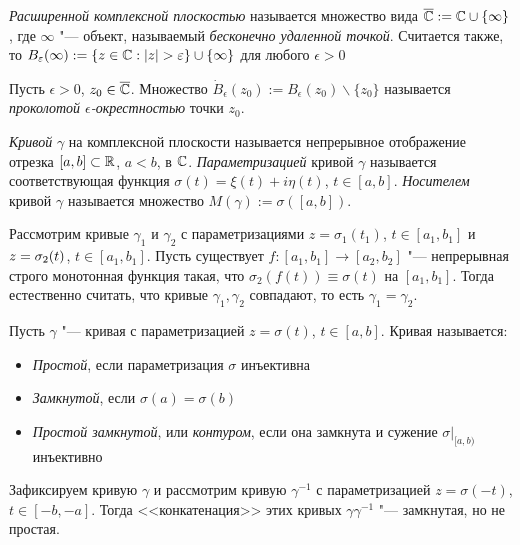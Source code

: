 \begin{definition}
	\textit{Расширенной комплексной плоскостью} называется множество вида $\overline{\mathbb{C}} := \mathbb{C} \cup \{\infty\}$, где $\infty$ "--- объект, называемый \textit{бесконечно удаленной точкой}. Считается также, то $B_{\varepsilon}(\infty) := \{z \in \mathbb{C}: |z| > \varepsilon\} \cup \{\infty\}$ для любого $\epsilon > 0$
\end{definition}

\begin{definition}
	Пусть $\epsilon > 0$, $z_0 \in \overline{\mathbb{C}}$. Множество $\dot B_\epsilon(z_0) := B_\epsilon(z_0) \backslash \{z_0\}$ называется \textit{проколотой $\epsilon$-окрестностью} точки $z_0$.
\end{definition}

\begin{definition}
	\textit{Кривой} $\gamma$ на комплексной плоскости называется непрерывное отображение отрезка $[a, b] \subset \mathbb{R}$, $a < b$, в $\mathbb{C}$. \textit{Параметризацией} кривой $\gamma$ называется соответствующая 	функция $\sigma(t) = \xi(t) + i\eta(t)$, $t \in [a, b]$. \textit{Носителем} кривой $\gamma$ называется множество $M(\gamma) := \sigma([a, b])$. 
\end{definition}

\begin{note}
	Рассмотрим кривые $\gamma_1$ и $\gamma_2$ с параметризациями $z = \sigma_1(t_1)$, $t \in [a_1, b_1]$ и $z \hm= \sigma_2(t)$, $t \in [a_1, b_1]$. Пусть существует $f : [a_1, b_1] \to [a_2, b_2]$ "--- непрерывная строго монотонная функция такая, что $\sigma_2(f(t)) \equiv \sigma(t)$ на $[a_1, b_1]$. Тогда естественно считать, что кривые $\gamma_1, \gamma_2$ совпадают, то есть $\gamma_1 = \gamma_2$.
\end{note}

\begin{definition}
	Пусть $\gamma$ "--- кривая с параметризацией $z = \sigma(t)$, $t \in [a, b]$. Кривая называется:
	\begin{itemize}
		\item \textit{Простой}, если параметризация $\sigma$ инъективна
		\item \textit{Замкнутой}, если $\sigma(a) = \sigma(b)$
		\item \textit{Простой замкнутой}, или \textit{контуром}, если она замкнута и сужение $\sigma|_{[a, b)}$ инъективно
	\end{itemize}
\end{definition}

\begin{example}
	Зафиксируем кривую $\gamma$ и рассмотрим кривую $\gamma^{-1}$ с параметризацией $z = \sigma(-t)$, $t \in [-b, -a]$. Тогда <<конкатенация>> этих кривых $\gamma\gamma^{-1}$ "--- замкнутая, но не простая.
\end{example}


